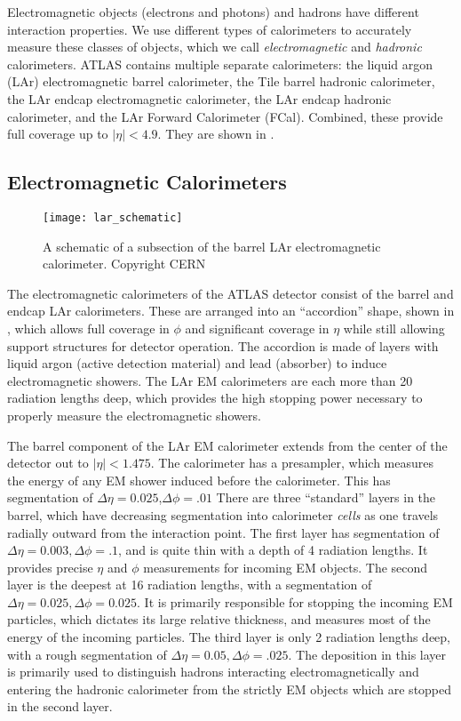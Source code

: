 Electromagnetic objects (electrons and photons) and hadrons have different interaction properties.
We use different types of calorimeters to accurately measure these classes of objects, which we call \textit{electromagnetic} and \textit{hadronic} calorimeters.
ATLAS contains multiple separate calorimeters: the liquid argon (LAr) electromagnetic barrel calorimeter, the Tile barrel hadronic calorimeter, the LAr endcap electromagnetic calorimeter, the LAr endcap hadronic calorimeter, and the LAr Forward Calorimeter (FCal).
Combined, these provide full coverage up to $|\eta| <4.9$.
They are shown in .

\subsection{Electromagnetic Calorimeters}
\begin{figure}[tbp]
\caption{A schematic of a subsection of the barrel LAr electromagnetic calorimeter. Copyright CERN} \label{fig:lar_schematic}
\texttt{[image: lar\_schematic]}
\end{figure}

The electromagnetic calorimeters of the ATLAS detector consist of the barrel and endcap LAr calorimeters.
These are arranged into an ``accordion'' shape, shown in , which allows full coverage in $\phi$ and significant coverage in $\eta$ while still allowing support structures for detector operation.
The accordion is made of layers with liquid argon (active detection material) and lead (absorber) to induce electromagnetic showers.
The LAr EM calorimeters are each more than 20 radiation lengths deep, which provides the high stopping power necessary to properly measure the electromagnetic showers.

The barrel component of the LAr EM calorimeter extends from the center of the detector out to $| \eta| <  1.475 $.
The calorimeter has a presampler, which measures the energy of any EM shower induced before the calorimeter.
This has segmentation of $\Delta\eta = 0.025$,$ \Delta\phi = .01$
There are three ``standard'' layers in the barrel, which have decreasing segmentation into calorimeter \textit{cells} as one travels radially outward from the interaction point.
The first layer has segmentation of $\Delta\eta = 0.003, \Delta\phi = .1$, and is quite thin with a depth of 4 radiation lengths.
It provides precise $\eta$ and $\phi$ measurements for incoming EM objects.
The second layer is the deepest at 16 radiation lengths, with a segmentation of $\Delta\eta = 0.025, \Delta\phi = 0.025$.
It is primarily responsible for stopping the incoming EM particles, which dictates its large relative thickness, and measures most of the energy of the incoming particles.
The third layer is only 2 radiation lengths deep, with a rough segmentation of $\Delta\eta = 0.05, \Delta\phi = .025$.
The deposition in this layer is primarily used to distinguish hadrons interacting electromagnetically and entering the hadronic calorimeter from the strictly EM objects which are stopped in the second layer.

